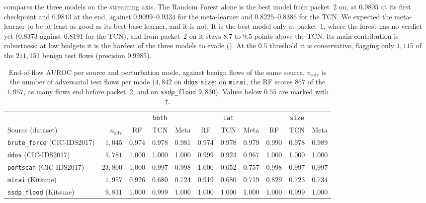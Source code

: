 \documentclass[acmtog,nonacm,pbalance]{acmart}
\newcommand{\src}[1]{\texttt{#1}}
\newcommand{\dmode}[1]{\texttt{#1}}
\begin{document}
 compares the three models on the streaming axis. The
Random Forest alone is the best model from packet~2 on, at $0.9805$ at its first
checkpoint and $0.9813$ at the end, against $0.9099$--$0.9334$ for the
meta-learner and $0.8225$--$0.8386$ for the TCN. We expected the meta-learner to
be at least as good as its best base learner, and it is not. It is the best model
only at packet~1, where the forest has no verdict yet ($0.8373$ against $0.8191$
for the TCN), and from packet~2 on it stays $8.7$ to $9.5$ points above the TCN.
Its main contribution is robustness: at low budgets it is the hardest of the
three models to evade (). At the $0.5$ threshold it is
conservative, flagging only $1{,}115$ of the $211{,}151$ benign test flows
(precision $0.9985$).

\begin{table}[t]
  \caption{End-of-flow AUROC per source and perturbation mode, against benign
  flows of the same source. $n_{\text{adv}}$ is the number of adversarial test
  flows per mode ($4{,}842$ on \src{ddos} \dmode{size}; on \src{mirai}, the RF
  scores $867$ of the $1{,}957$, as many flows end before packet~2, and on
  \src{ssdp\_flood} $9{,}830$). Values below $0.55$ are marked with $\dagger$.}
  \label{tab:persource}
  \footnotesize
  \setlength{\tabcolsep}{5pt}
  \begin{tabular}{@{}lr ccc ccc ccc@{}}
    \toprule
    & & \multicolumn{3}{c}{\dmode{both}} & \multicolumn{3}{c}{\dmode{iat}} & \multicolumn{3}{c}{\dmode{size}} \\
    \cmidrule(lr){3-5}\cmidrule(lr){6-8}\cmidrule(lr){9-11}
    Source (dataset) & $n_{\text{adv}}$ & RF & TCN & Meta & RF & TCN & Meta & RF & TCN & Meta \\
    \midrule
    \src{brute\_force} (CIC-IDS2017) & $1{,}045$ & 0.974 & 0.978 & 0.981 & 0.974 & 0.978 & 0.979 & 0.990 & 0.978 & 0.989 \\
    \src{ddos} (CIC-IDS2017) & $5{,}781$ & 1.000 & 1.000 & 1.000 & 0.999 & 0.924 & 0.967 & 1.000 & 1.000 & 1.000 \\
    \src{portscan} (CIC-IDS2017) & $23{,}800$ & 1.000 & 0.997 & 0.998 & 1.000 & 0.652 & 0.757 & 0.998 & 0.997 & 0.997 \\
    \src{mirai} (Kitsune) & $1{,}957$ & 0.926 & 0.680 & 0.724 & 0.919 & 0.680 & 0.719 & 0.829 & 0.723 & 0.734 \\
    \src{ssdp\_flood} (Kitsune) & $9{,}831$ & 1.000 & 0.999 & 1.000 & 1.000 & 1.000 & 1.000 & 1.000 & 0.999 & 1.000 \\

\end{tabular}
\end{table}
\end{document}
